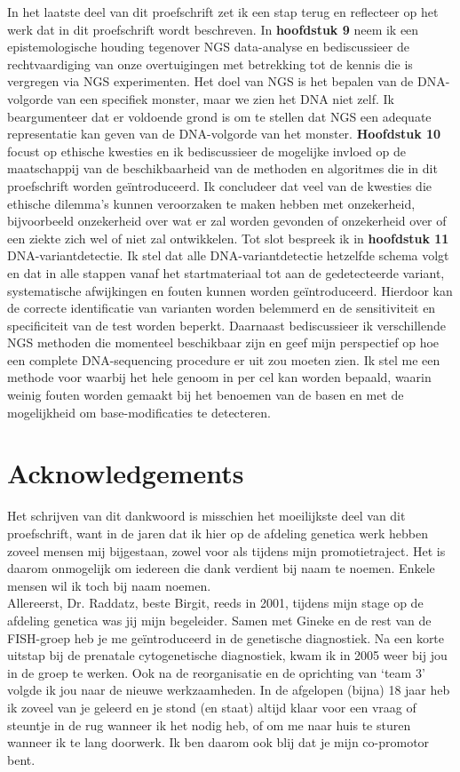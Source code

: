 \begin{appendices}
	In het laatste deel van dit proefschrift zet ik een stap terug en reflecteer op het werk dat in dit proefschrift wordt beschreven. In \textbf{hoofdstuk 9} neem ik een epistemologische houding tegenover NGS data-analyse en bediscussieer de rechtvaardiging van onze overtuigingen met betrekking tot de kennis die is vergregen via NGS experimenten. Het doel van NGS is het bepalen van de DNA-volgorde van een specifiek monster, maar we zien het DNA niet zelf. Ik beargumenteer dat er voldoende grond is om te stellen dat NGS een adequate representatie kan geven van de DNA-volgorde van het monster. \textbf{Hoofdstuk 10} focust op ethische kwesties en ik bediscussieer de mogelijke invloed op de maatschappij van de beschikbaarheid van de methoden en algoritmes die in dit proefschrift worden geïntroduceerd. Ik concludeer dat veel van de kwesties die ethische dilemma’s kunnen veroorzaken te maken hebben met onzekerheid, bijvoorbeeld onzekerheid over wat er zal worden gevonden of onzekerheid over of een ziekte zich wel of niet zal ontwikkelen. Tot slot bespreek ik in \textbf{hoofdstuk 11} DNA-variantdetectie. Ik stel dat alle DNA-variantdetectie hetzelfde schema volgt en dat in alle stappen vanaf het startmateriaal tot aan de gedetecteerde variant, systematische afwijkingen en fouten kunnen worden geïntroduceerd. Hierdoor kan de correcte identificatie van varianten worden belemmerd en de sensitiviteit en specificiteit van de test worden beperkt. Daarnaast bediscussieer ik verschillende NGS methoden die momenteel beschikbaar zijn en geef mijn perspectief op hoe een complete DNA-sequencing procedure er uit zou moeten zien. Ik stel me een methode voor waarbij het hele genoom in per cel kan worden bepaald, waarin weinig fouten worden gemaakt bij het benoemen van de basen en met de mogelijkheid om base-modificaties te detecteren.
	
	
	\chapter{Acknowledgements}
	
	Het schrijven van dit dankwoord is misschien het moeilijkste deel van dit proefschrift, want in de jaren dat ik hier op de afdeling genetica werk hebben zoveel mensen mij bijgestaan, zowel voor als tijdens mijn promotietraject. Het is daarom onmogelijk om iedereen die dank verdient bij naam te noemen. Enkele mensen wil ik toch bij naam noemen.\\
	
	\noindent Allereerst, Dr. Raddatz, beste Birgit, reeds in 2001, tijdens mijn stage op de afdeling genetica was jij mijn begeleider. Samen met Gineke en de rest van de FISH-groep heb je me geïntroduceerd in de genetische diagnostiek. Na een korte uitstap bij de prenatale cytogenetische diagnostiek, kwam ik in 2005 weer bij jou in de groep te werken. Ook na de reorganisatie en de oprichting van ‘team 3’ volgde ik jou naar de nieuwe werkzaamheden. In de afgelopen (bijna) 18 jaar heb ik zoveel van je geleerd en je stond (en staat) altijd klaar voor een vraag of steuntje in de rug wanneer ik het nodig heb, of om me naar huis te sturen wanneer ik te lang doorwerk. Ik ben daarom ook blij dat je mijn co-promotor bent.\\ 
	

\end{appendices}

